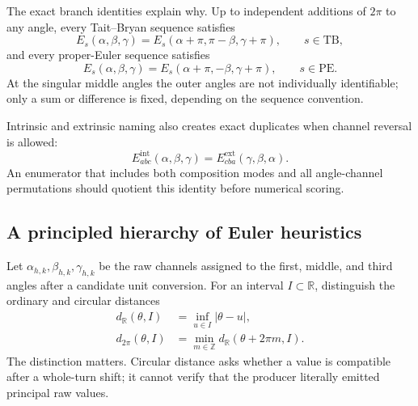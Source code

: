 \documentclass[11pt]{article}
\newcommand{\R}{\mathbb{R}}
\newcommand{\TB}{\mathrm{TB}}
\newcommand{\PE}{\mathrm{PE}}
\newcommand{\abs}[1]{\left\lvert #1 \right\rvert}
\begin{document}
    The exact branch identities explain why. Up to independent additions of $2\pi$ to any
    angle, every Tait--Bryan sequence satisfies
    \begin{equation}
        E_s(\alpha,\beta,\gamma)
        =E_s(\alpha+\pi,\pi-\beta,\gamma+\pi),
        \qquad s\in\TB,
        \label{eq:tait-bryan-branch}
    \end{equation}
    and every proper-Euler sequence satisfies
    \begin{equation}
        E_s(\alpha,\beta,\gamma)
        =E_s(\alpha+\pi,-\beta,\gamma+\pi),
        \qquad s\in\PE.
        \label{eq:proper-euler-branch}
    \end{equation}
    At the singular middle angles the outer angles are not individually identifiable; only a
    sum or difference is fixed, depending on the sequence convention.

    Intrinsic and extrinsic naming also creates exact duplicates when channel reversal is
    allowed:
    \begin{equation}
        E_{abc}^{\mathrm{int}}(\alpha,\beta,\gamma)
        =E_{cba}^{\mathrm{ext}}(\gamma,\beta,\alpha).
        \label{eq:intrinsic-extrinsic-reversal}
    \end{equation}
    An enumerator that includes both composition modes and all angle-channel permutations
    should quotient this identity before numerical scoring.

    \subsection{A principled hierarchy of Euler heuristics}

    Let $\alpha_{h,k},\beta_{h,k},\gamma_{h,k}$ be the raw channels assigned to the
    first, middle, and third angles after a candidate unit conversion. For an interval
    $I\subset\R$, distinguish the ordinary and circular distances
    \begin{align}
        d_{\R}(\theta,I)&=\inf_{u\in I}\abs{\theta-u},\\
        d_{2\pi}(\theta,I)&=\min_{m\in\mathbb Z}d_{\R}(\theta+2\pi m,I).
    \end{align}
    The distinction matters. Circular distance asks whether a value is compatible after a
    whole-turn shift; it cannot verify that the producer literally emitted principal raw
    values.
\end{document}
